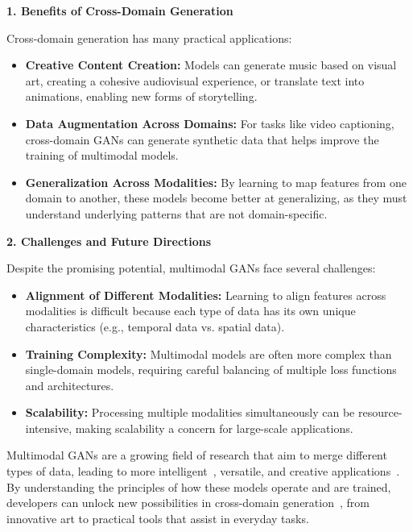 \textbf{1. Benefits of Cross-Domain Generation}

Cross-domain generation has many practical applications:
\begin{itemize}
    \item \textbf{Creative Content Creation:} Models can generate music based on visual art, creating a cohesive audiovisual experience, or translate text into animations, enabling new forms of storytelling.
    \item \textbf{Data Augmentation Across Domains:} For tasks like video captioning, cross-domain GANs can generate synthetic data that helps improve the training of multimodal models.
    \item \textbf{Generalization Across Modalities:} By learning to map features from one domain to another, these models become better at generalizing, as they must understand underlying patterns that are not domain-specific.
\end{itemize}

\textbf{2. Challenges and Future Directions}

Despite the promising potential, multimodal GANs face several challenges:
\begin{itemize}
    \item \textbf{Alignment of Different Modalities:} Learning to align features across modalities is difficult because each type of data has its own unique characteristics (e.g., temporal data vs. spatial data).
    \item \textbf{Training Complexity:} Multimodal models are often more complex than single-domain models, requiring careful balancing of multiple loss functions and architectures.
    \item \textbf{Scalability:} Processing multiple modalities simultaneously can be resource-intensive, making scalability a concern for large-scale applications.
\end{itemize}

Multimodal GANs are a growing field of research that aim to merge different types of data, leading to more intelligent~\cite{li2024survey}, versatile, and creative applications~\cite{liu2019multi}. By understanding the principles of how these models operate and are trained, developers can unlock new possibilities in cross-domain generation~\cite{de2021survey}, from innovative art to practical tools that assist in everyday tasks.
